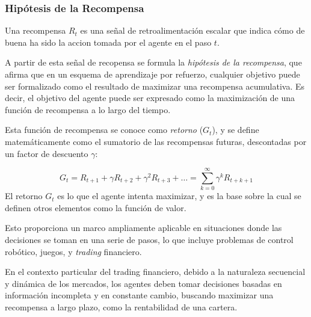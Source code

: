 \documentclass[a4paper,12pt]{report}
\begin{document}
\subsubsection{Hipótesis de la Recompensa}

Una recompensa \(R_t\) es una señal de retroalimentación escalar que indica cómo de buena ha sido la accion 
tomada por el agente en el paso \(t\). 

A partir de esta señal de recopensa se formula
la \textit{hipótesis de la recompensa}, que afirma que en un esquema de aprendizaje por refuerzo, cualquier 
objetivo puede ser formalizado como el resultado de maximizar una recompensa acumulativa. Es decir, el objetivo del agente puede ser expresado como la maximización de una función de recompensa a lo 
largo del tiempo.

Esta función de recompensa se conoce como \textit{retorno} (\(G_t\)), y se define matemáticamente como el sumatorio
de las recompensas futuras, descontadas por un factor de descuento  \(\gamma\):

\[
G_t = R_{t+1} + \gamma R_{t+2} + \gamma^2 R_{t+3} + \dots = \sum_{k=0}^{\infty} \gamma^k R_{t+k+1}
\]
El retorno \(G_t\) es lo que el agente intenta maximizar, y es la base sobre la cual se definen otros elementos como la función de valor.


Esto proporciona un marco ampliamente aplicable en situaciones donde 
las decisiones se toman en una serie de pasos, lo que incluye problemas de control robótico, juegos, 
y \textit{trading} financiero.

En el contexto particular del trading financiero, debido a la naturaleza secuencial y dinámica de 
los mercados, los agentes deben tomar decisiones basadas en información incompleta y en constante 
cambio, buscando maximizar una recompensa a largo plazo, como la rentabilidad de una cartera.



\end{document}
